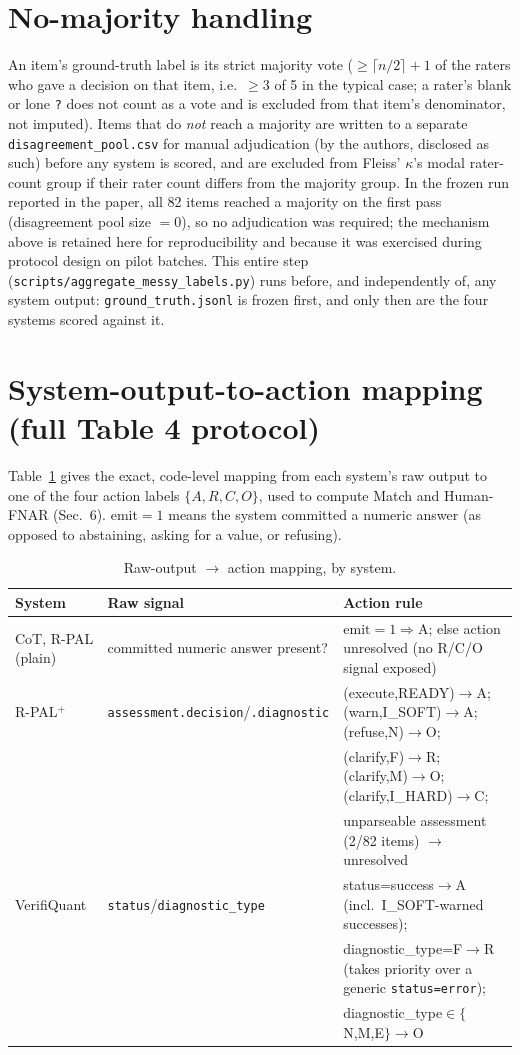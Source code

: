 \documentclass[11pt]{article}
\begin{document}
\section{No-majority handling}
An item's ground-truth label is its strict majority vote ($\geq\lceil n/2\rceil{+}1$ of the
raters who gave a decision on that item, i.e.\ $\geq 3$ of 5 in the typical case; a rater's blank
or lone \texttt{?} does not count as a vote and is excluded from that item's denominator, not
imputed). Items that do \emph{not} reach a majority are written to a separate
\texttt{disagreement\_pool.csv} for manual adjudication (by the authors, disclosed as such) before
any system is scored, and are excluded from Fleiss' $\kappa$'s modal rater-count group if their
rater count differs from the majority group. In the frozen run reported in the paper, all 82
items reached a majority on the first pass (disagreement pool size $=0$), so no adjudication was
required; the mechanism above is retained here for reproducibility and because it was exercised
during protocol design on pilot batches.
This entire step (\texttt{scripts/aggregate\_messy\_labels.py}) runs before, and independently
of, any system output: \texttt{ground\_truth.jsonl} is frozen first, and only then are the four
systems scored against it.

\section{System-output-to-action mapping (full Table 4 protocol)}
Table~\ref{tab:appendix-actionmap} gives the exact, code-level mapping from each system's raw
output to one of the four action labels $\{A,R,C,O\}$, used to compute Match and Human-FNAR
(Sec.~6). $\mathrm{emit}=1$ means the system committed a numeric answer (as opposed to
abstaining, asking for a value, or refusing).

\begin{table}[h]
\centering
\caption{Raw-output $\to$ action mapping, by system.}
\label{tab:appendix-actionmap}
\small
\begin{tabular}{@{}lll@{}}
\toprule
System & Raw signal & Action rule \\
\midrule
CoT, R-PAL (plain) & committed numeric answer present? &
  $\mathrm{emit}{=}1\Rightarrow$A; else action unresolved (no R/C/O signal exposed) \\
R-PAL$^{+}$ & \texttt{assessment.decision}/\texttt{.diagnostic} &
  (execute,READY)$\to$A; (warn,I\_SOFT)$\to$A; (refuse,N)$\to$O; \\
 & & (clarify,F)$\to$R; (clarify,M)$\to$O; (clarify,I\_HARD)$\to$C; \\
 & & unparseable assessment (2/82 items) $\to$ unresolved \\
VerifiQuant & \texttt{status}/\texttt{diagnostic\_type} &
  status=success$\to$A (incl.\ I\_SOFT-warned successes); \\
 & & diagnostic\_type=F$\to$R (takes priority over a generic \texttt{status=error}); \\
 & & diagnostic\_type$\in\{$N,M,E$\}\to$O \\
\bottomrule
\end{tabular}
\end{table}
\end{document}
